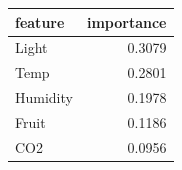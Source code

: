 \begin{tabular}{lr}
\toprule
feature & importance \\
\midrule
Light & 0.3079 \\
Temp & 0.2801 \\
Humidity & 0.1978 \\
Fruit & 0.1186 \\
CO2 & 0.0956 \\
\bottomrule
\end{tabular}
